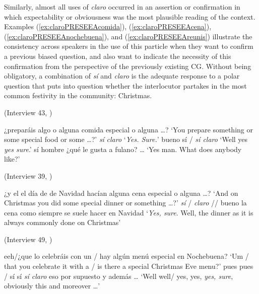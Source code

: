 Similarly, almost all uses of \textit{claro} occurred in an assertion or confirmation in which expectability or obviousness was the most plausible reading of the context. Examples (\ref{ex:claroPRESEEAcomida}), (\ref{ex:claroPRESEEAcena}), (\ref{ex:claroPRESEEAnochebuena}), and (\ref{ex:claroPRESEEAreunis}) illustrate the consistency across speakers in the use of this particle when they want to confirm a previous biased question, and also want to indicate the necessity of this confirmation from the perspective of the previously existing \ac{CG}. Without being obligatory, a combination of \textit{sí} and \textit{claro} is the adequate response to a polar question that puts into question whether the interlocutor partakes in the most common festivity in the community: Christmas.

\begin{exe}
\ex \label{ex:claroPRESEEAcomida} (Interview 43, \citealt{PRESEEA.20142020}) 
	\begin{xlist}[A:]
	¿preparáis algo o alguna comida especial o alguna \ldots? 
	\glt `You prepare something or some special food or some \ldots?' 
	\textit{sí} \textit{claro}
	\glt `\textit{Yes. Sure.}' 
	bueno sí / \textit{sí claro}
	\glt `Well yes \textit{yes sure}.' 
	sí hombre ¿qué le gusta a fulano? \ldots 
	\glt `Yes man. What does anybody like?' 
	\end{xlist}

\ex \label{ex:claroPRESEEAcena} (Interview 39, \citealt{PRESEEA.20142020}) 
	\begin{xlist}[A:]
	¿y el el día de de Navidad hacían alguna cena especial o alguna \ldots? 
	\glt `And on Christmas you did some special dinner or something \ldots?'	
	\textit{sí} / \textit{claro} // bueno la cena como siempre se suele hacer en Navidad 
	\glt `\textit{Yes, sure}. Well, the dinner as it is always commonly done on Christmas' 
	\end{xlist}

\ex \label{ex:claroPRESEEAnochebuena} (Interview 49, \citealt{PRESEEA.20142020}) 
	\begin{xlist}[A:]
	eeh/¿que lo celebráis con un / hay algún menú especial en Nochebuena? 
	\glt `Um / that you celebrate it with a / is there a special Christmas Eve menu?'	
	pues pues / sí sí \textit{sí claro} eso por supuesto y además \ldots 
	\glt `Well well/ yes, yes, \textit{yes, sure}, obviously this and moreover \ldots' 
	\end{xlist}


\end{exe}
